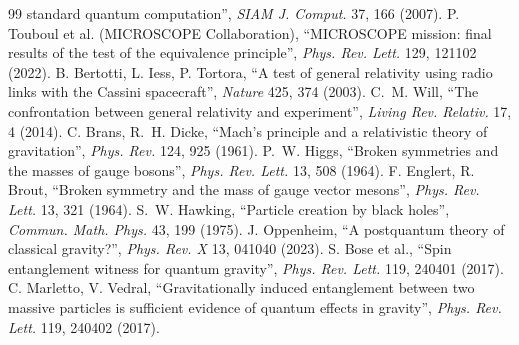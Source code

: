 \documentclass[11pt,a4paper]{article}
\theoremstyle{definition}
\begin{document}
\begin{thebibliography}{99}
standard quantum computation'', \emph{SIAM J. Comput.} 37, 166 (2007).
 P. Touboul et al. (MICROSCOPE Collaboration), ``MICROSCOPE mission: final results of the test of the equivalence
principle'', \emph{Phys. Rev. Lett.} 129, 121102 (2022).
 B. Bertotti, L. Iess, P. Tortora, ``A test of general relativity using radio links with the Cassini spacecraft'',
\emph{Nature} 425, 374 (2003).
 C.~M. Will, ``The confrontation between general relativity and experiment'', \emph{Living Rev. Relativ.} 17, 4 (2014).
 C. Brans, R.~H. Dicke, ``Mach's principle and a relativistic theory of gravitation'', \emph{Phys. Rev.} 124, 925 (1961).
 P.~W. Higgs, ``Broken symmetries and the masses of gauge bosons'', \emph{Phys. Rev. Lett.} 13, 508 (1964).
 F. Englert, R. Brout, ``Broken symmetry and the mass of gauge vector mesons'', \emph{Phys. Rev. Lett.} 13, 321 (1964).
 S.~W. Hawking, ``Particle creation by black holes'', \emph{Commun. Math. Phys.} 43, 199 (1975).
 J. Oppenheim, ``A postquantum theory of classical gravity?'', \emph{Phys. Rev. X} 13, 041040 (2023).
 S. Bose et al., ``Spin entanglement witness for quantum gravity'', \emph{Phys. Rev. Lett.} 119, 240401 (2017).
 C. Marletto, V. Vedral, ``Gravitationally induced entanglement between two massive particles is sufficient evidence of
quantum effects in gravity'', \emph{Phys. Rev. Lett.} 119, 240402 (2017).
\end{thebibliography}
\end{document}
